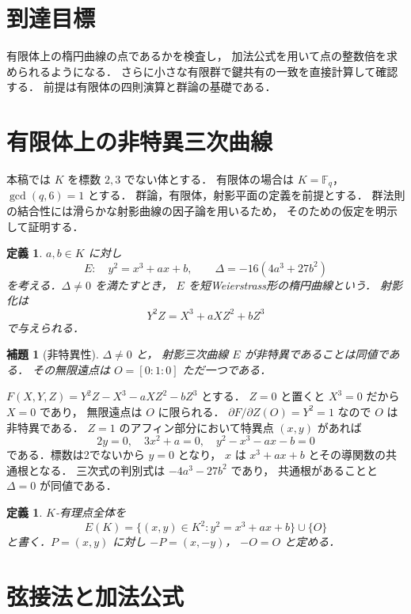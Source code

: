 \documentclass[a5paper,10pt,onecolumn]{jsarticle}
\makeatletter
\theoremstyle{mathnotetheorem}
\newtheorem{definition}[theorem]{定義}
\newtheorem{lemma}[theorem]{補題}
\renewcommand{\proofname}{証明}
\renewenvironment{proof}[1][\proofname]{%
  \par\pushQED{\qed}\normalfont\topsep4\p@\@plus2\p@\relax
  \trivlist\item[\hskip\labelsep\bfseries #1]\ignorespaces
}{\popQED\endtrivlist\@endpefalse}
\makeatother
\begin{document}
\section*{到達目標}
有限体上の楕円曲線の点であるかを検査し，
加法公式を用いて点の整数倍を求められるようになる．
さらに小さな有限群で鍵共有の一致を直接計算して確認する．
前提は有限体の四則演算と群論の基礎である．

\section{有限体上の非特異三次曲線}

本稿では $K$ を標数 $2,3$ でない体とする．
有限体の場合は $K=\mathbb F_q$，$\gcd(q,6)=1$ とする．
群論，有限体，射影平面の定義を前提とする．
群法則の結合性には滑らかな射影曲線の因子論を用いるため，
そのための仮定を明示して証明する．

\begin{definition}
$a,b\in K$ に対し
\[
 E:\quad y^2=x^3+ax+b,\qquad
 \Delta=-16(4a^3+27b^2)
\]
を考える．$\Delta\ne0$ を満たすとき，
$E$ を短Weierstrass形の楕円曲線という．
射影化は
\[
 Y^2Z=X^3+aXZ^2+bZ^3
\]
で与えられる．
\end{definition}

\begin{lemma}[非特異性]\label{lem:smooth}
$\Delta\ne0$ と，
射影三次曲線 $E$ が非特異であることは同値である．
その無限遠点は $O=[0:1:0]$ ただ一つである．
\end{lemma}
\begin{proof}
$F(X,Y,Z)=Y^2Z-X^3-aXZ^2-bZ^3$ とする．
$Z=0$ と置くと $X^3=0$ だから $X=0$ であり，
無限遠点は $O$ に限られる．
$\partial F/\partial Z(O)=Y^2=1$ なので $O$ は非特異である．
$Z=1$ のアフィン部分において特異点 $(x,y)$ があれば
\[
 2y=0,\quad 3x^2+a=0,\quad y^2-x^3-ax-b=0
\]
である．標数は2でないから $y=0$ となり，
$x$ は $x^3+ax+b$ とその導関数の共通根となる．
三次式の判別式は $-4a^3-27b^2$ であり，
共通根があることと $\Delta=0$ が同値である．
\end{proof}

\begin{definition}
$K$-有理点全体を
\[
 E(K)=\{(x,y)\in K^2:y^2=x^3+ax+b\}\cup\{O\}
\]
と書く．$P=(x,y)$ に対し $-P=(x,-y)$，
$-O=O$ と定める．
\end{definition}

\section{弦接法と加法公式}
\end{document}
